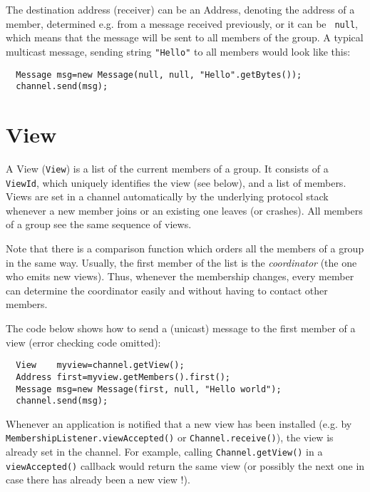   The destination address (receiver) can be an Address, denoting the address of a
  member, determined e.g. from a message received previously, or it can be {\tt
  null}, which means that the message will be sent to all members of the group. A
  typical multicast message, sending string {\tt "Hello"} to all members would
  look like this:

  \begin{small}
  \begin{verbatim}
  Message msg=new Message(null, null, "Hello".getBytes());
  channel.send(msg);
  \end{verbatim}
  \end{small}



  \section{View} \label{View}

  A View ({\tt View}) is a list of the current members of a group. It consists of a
  {\tt ViewId}, which uniquely identifies the view (see below), and a list of
  members. Views are set in a channel automatically by the underlying protocol stack
  whenever a new member joins or an existing one leaves (or crashes). All members of
  a group see the same sequence of views.

  Note that there is a comparison function which orders all the members of a group
  in the same way. Usually, the first member of the list is the {\em coordinator}
  (the one who emits new views). Thus, whenever the membership changes, every member
  can determine the coordinator easily and without having to contact other members.
  
  The code below shows how to send a (unicast) message to the first member of a view
  (error checking code omitted):

  \begin{small}
  \begin{verbatim}
  View    myview=channel.getView();
  Address first=myview.getMembers().first();
  Message msg=new Message(first, null, "Hello world");
  channel.send(msg);
  \end{verbatim}
  \end{small}


  Whenever an application is notified that a new view has been installed (e.g. by
  {\tt MembershipListener.viewAccepted()} or {\tt Channel.receive()}), the view is
  already set in the channel. For example, calling {\tt Channel.getView()} in a {\tt
  viewAccepted()} callback would return the same view (or possibly the next one in
  case there has already been a new view !).

